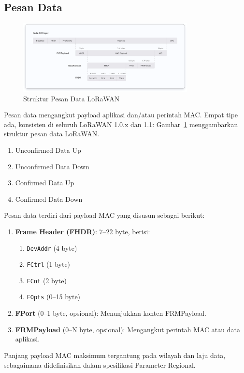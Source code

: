 \subsection{Pesan Data}
\begin{figure}
    \centering
    \includegraphics[width=0.8\textwidth]{figures/payload.png}
    \caption{Struktur Pesan Data LoRaWAN}
    \label{fig:lora_data_message}
\end{figure}
Pesan data mengangkut payload aplikasi dan/atau perintah MAC. Empat tipe ada, konsisten di seluruh LoRaWAN 1.0.x dan 1.1:
Gambar~\ref{fig:lora_data_message} menggambarkan struktur pesan data LoRaWAN.
\begin{enumerate}
    \item Unconfirmed Data Up
    \item Unconfirmed Data Down
    \item Confirmed Data Up
    \item Confirmed Data Down
\end{enumerate}
Pesan data terdiri dari payload MAC yang disusun sebagai berikut:
\begin{enumerate}
    \item \textbf{Frame Header (FHDR)}: 7–22 byte, berisi:
          \begin{enumerate}
              \item \texttt{DevAddr} (4 byte)
              \item \texttt{FCtrl} (1 byte)
              \item \texttt{FCnt} (2 byte)
              \item \texttt{FOpts} (0–15 byte)
          \end{enumerate}
    \item \textbf{FPort} (0–1 byte, opsional): Menunjukkan konten FRMPayload.
    \item \textbf{FRMPayload} (0–N byte, opsional): Mengangkut perintah MAC atau data aplikasi.
\end{enumerate}
Panjang payload MAC maksimum tergantung pada wilayah dan laju data, sebagaimana didefinisikan dalam spesifikasi Parameter Regional.
